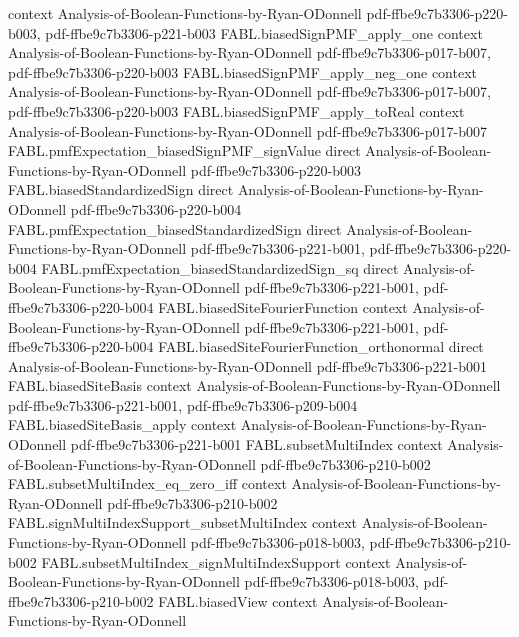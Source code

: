 \begin{theorem}
  {context}
  {Analysis-of-Boolean-Functions-by-Ryan-ODonnell}
  {pdf-ffbe9c7b3306-p220-b003,
    pdf-ffbe9c7b3306-p221-b003}
\proofstep
  {FABL.biasedSignPMF_apply_one}
  {context}
  {Analysis-of-Boolean-Functions-by-Ryan-ODonnell}
  {pdf-ffbe9c7b3306-p017-b007,
    pdf-ffbe9c7b3306-p220-b003}
\proofstep
  {FABL.biasedSignPMF_apply_neg_one}
  {context}
  {Analysis-of-Boolean-Functions-by-Ryan-ODonnell}
  {pdf-ffbe9c7b3306-p017-b007,
    pdf-ffbe9c7b3306-p220-b003}
\proofstep
  {FABL.biasedSignPMF_apply_toReal}
  {context}
  {Analysis-of-Boolean-Functions-by-Ryan-ODonnell}
  {pdf-ffbe9c7b3306-p017-b007}
\proofstep
  {FABL.pmfExpectation_biasedSignPMF_signValue}
  {direct}
  {Analysis-of-Boolean-Functions-by-Ryan-ODonnell}
  {pdf-ffbe9c7b3306-p220-b003}
\proofstep
  {FABL.biasedStandardizedSign}
  {direct}
  {Analysis-of-Boolean-Functions-by-Ryan-ODonnell}
  {pdf-ffbe9c7b3306-p220-b004}
\proofstep
  {FABL.pmfExpectation_biasedStandardizedSign}
  {direct}
  {Analysis-of-Boolean-Functions-by-Ryan-ODonnell}
  {pdf-ffbe9c7b3306-p221-b001,
    pdf-ffbe9c7b3306-p220-b004}
\proofstep
  {FABL.pmfExpectation_biasedStandardizedSign_sq}
  {direct}
  {Analysis-of-Boolean-Functions-by-Ryan-ODonnell}
  {pdf-ffbe9c7b3306-p221-b001,
    pdf-ffbe9c7b3306-p220-b004}
\proofstep
  {FABL.biasedSiteFourierFunction}
  {context}
  {Analysis-of-Boolean-Functions-by-Ryan-ODonnell}
  {pdf-ffbe9c7b3306-p221-b001,
    pdf-ffbe9c7b3306-p220-b004}
\proofstep
  {FABL.biasedSiteFourierFunction_orthonormal}
  {direct}
  {Analysis-of-Boolean-Functions-by-Ryan-ODonnell}
  {pdf-ffbe9c7b3306-p221-b001}
\proofstep
  {FABL.biasedSiteBasis}
  {context}
  {Analysis-of-Boolean-Functions-by-Ryan-ODonnell}
  {pdf-ffbe9c7b3306-p221-b001,
    pdf-ffbe9c7b3306-p209-b004}
\proofstep
  {FABL.biasedSiteBasis_apply}
  {context}
  {Analysis-of-Boolean-Functions-by-Ryan-ODonnell}
  {pdf-ffbe9c7b3306-p221-b001}
\proofstep
  {FABL.subsetMultiIndex}
  {context}
  {Analysis-of-Boolean-Functions-by-Ryan-ODonnell}
  {pdf-ffbe9c7b3306-p210-b002}
\proofstep
  {FABL.subsetMultiIndex_eq_zero_iff}
  {context}
  {Analysis-of-Boolean-Functions-by-Ryan-ODonnell}
  {pdf-ffbe9c7b3306-p210-b002}
\proofstep
  {FABL.signMultiIndexSupport_subsetMultiIndex}
  {context}
  {Analysis-of-Boolean-Functions-by-Ryan-ODonnell}
  {pdf-ffbe9c7b3306-p018-b003,
    pdf-ffbe9c7b3306-p210-b002}
\proofstep
  {FABL.subsetMultiIndex_signMultiIndexSupport}
  {context}
  {Analysis-of-Boolean-Functions-by-Ryan-ODonnell}
  {pdf-ffbe9c7b3306-p018-b003,
    pdf-ffbe9c7b3306-p210-b002}
\proofstep
  {FABL.biasedView}
  {context}
  {Analysis-of-Boolean-Functions-by-Ryan-ODonnell}

\end{theorem}
